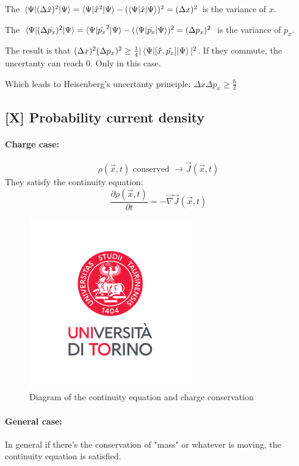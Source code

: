 The $\braket{\Psi | (\Delta \hat{x})^2 |  \Psi} = \braket{\Psi | \hat{x}^2 | \Psi} - (\braket{\Psi | \hat{x} | \Psi})^2 = (\Delta x)^2$ is the variance of $x$.

\vspace{10pt}

The $\braket{\Psi | (\Delta \hat{p_x})^2 |  \Psi} = \braket{\Psi | \hat{p_x}^2 | \Psi} - (\braket{\Psi | \hat{p_x} | \Psi})^2 = (\Delta p_x)^2$ is the variance of $p_x$.

\vspace{10pt}

The result is that $(\Delta x)^2(\Delta p_x)^2 \geq \frac{1}{4} |\braket{\Psi | [\hat{x}, \hat{p_x}] |\Psi}|^2$. If they commute, the uncertanty can reach 0. Only in this case.

Which leads to Heisenberg's uncertanty principle: $\Delta x\Delta p_x \geq \frac{\hbar}{2}$

\subsection{[X] Probability current density}

\paragraph{Charge case:}

$$\rho(\vec{x}, t) \text{ conserved } \rightarrow \vec{J}(\vec{x}, t)$$
%
They satisfy the continuity equation: 
$$\frac{\partial \rho(\vec{x}, t)}{\partial t} = -\vec{\nabla} \vec{J} (\vec{x}, t)$$

\begin{figure}[ht]
    \centering
    \includegraphics[width=.4\textwidth]{../images/logo.png}
    \caption{Diagram of the continuity equation and charge conservation}
    \label{fig:cont_eq}
\end{figure}

\paragraph{General case:} In general if there's the conservation of "mass" or whatever is moving, the continuity equation is satisfied.

